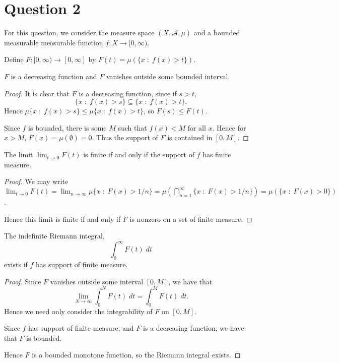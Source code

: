 \documentclass{unswmaths}
\begin{document}
\section*{Question 2}
    For this question, we consider the measure space $(X,\mathcal{A},\mu)$
    and a bounded measurable measurable function $f:X\rightarrow [0,\infty)$.
    
    Define $F:[0,\infty)\rightarrow[0,\infty]$
    by $F(t) = \mu(\{x\;:\;f(x) > t\})$.
    
\begin{lemma}
    $F$ is a decreasing function and $F$ vanishes outside some bounded interval.
\end{lemma}
\begin{proof}
    It is clear that $F$ is a decreasing function, since if $s > t$, 
    \begin{equation*}
        \{x\;:\;f(x) > s\} \subseteq \{x\;:\;f(x) > t\}.
    \end{equation*}
    Hence $\mu\{x\;:\;f(x) > s\} \leq \mu\{x\;:\;f(x) > t\}$, so $F(s) \leq F(t)$.
    
    Since $f$ is bounded, there is some $M$ such that $f(x) < M$ for all $x$. Hence for $x > M$, $F(x) = \mu(\emptyset) = 0$.
    Thus the support of $F$ is contained in $[0,M]$.
\end{proof}

\begin{lemma}
    The limit $\lim_{t\rightarrow 0} F(t)$ is finite if and only if the support of $f$ has finite measure.
\end{lemma}
\begin{proof}
    We may write $\lim_{t\rightarrow 0} F(t) = \lim_{n\rightarrow \infty} \mu\{x\;:\;F(x) > 1/n\} = \mu(\bigcap_{n=1}^\infty \{x\;:\;F(x) > 1/n\}) = \mu(\{x\;:\;F(x) > 0\})$.
    
    Hence this limit is finite if and only if $F$ is nonzero on a set of finite measure.
\end{proof}
\begin{theorem}
    The indefinite Riemann integral,
    \begin{equation*}
        \int_0^\infty F(t) \;dt
    \end{equation*}
    exists if $f$ has support of finite measure.
\end{theorem}
\begin{proof}
    Since $F$ vanishes outside some interval $[0,M]$, we have that
    \begin{equation*}
        \lim_{N\rightarrow \infty} \int_{0}^N F(t)\;dt = \int_{0}^M F(t)\;dt.
    \end{equation*}
    Hence we need only consider the integrability of $F$ on $[0,M]$.
    
    Since $f$ has support of finite measure, and $F$ is a decreasing function, we have that $F$ is bounded.
    
    Hence $F$ is a bounded monotone function, so the Riemann integral exists.
\end{proof}
\end{document}
